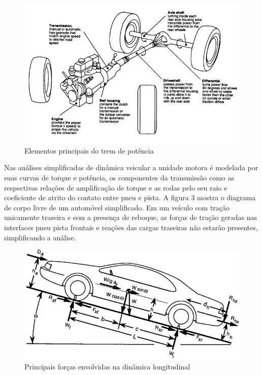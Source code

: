 \begin{figure}[htb]
	\caption{\label{fig:Fig_302}Elementos principais do trem de potência}
	\begin{center}
		\includegraphics[width=\textwidth]{images/img302.jpg}
	\end{center}
\end{figure}

Nas análises simplificadas de dinâmica veicular a unidade motora é modelada por suas curvas de torque e potência, os componentes da transmissão como as respectivas relações de amplificação de torque e as rodas pelo seu raio e coeficiente de atrito do contato entre pneu e pista. A figura 3 mostra o diagrama de corpo livre de um automóvel simplificado. Em um veículo com tração unicamente traseira e sem a presença de reboque, as forças de tração geradas nas interfaces pneu pista frontais e reações das cargas traseiras não estarão presentes, simplificando a análise.

\begin{figure}[htb]	
	\caption{\label{fig:Fig_303}Principais forças envolvidas na dinâmica longitudinal}
	\begin{center}
		\includegraphics[width=\textwidth]{images/img303.jpg}
	\end{center}
\end{figure}

